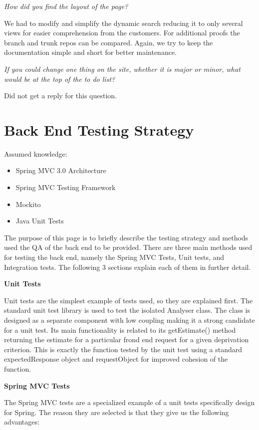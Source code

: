 \documentclass{l3proj}
\begin{document}
\textit{How did you find the layout of the page?}

We had to modify and simplify the dynamic search reducing it to only several views for easier comprehension from the customers. For additional proofs the branch and trunk repos can be compared. Again, we try to keep the documentation simple and short for better maintenance.

\textit{If you could change one thing on the site, whether it is major or minor, what would be at the top of the to do list?}

Did not get a reply for this question.

\section{Back End Testing Strategy}
\label{backEndTesting}


Assumed knowledge:
\begin{itemize}
\item Spring MVC 3.0 Architecture 
\item Spring MVC Testing Framework
\item  Mockito
\item  Java Unit Tests
\end{itemize}

The purpose of this page is to briefly describe the testing strategy and methods used the QA of the back end to be provided. There are three main methods used for testing the back end, namely the Spring MVC Tests, Unit tests, and Integration tests. The following 3 sections explain each of them in further detail.

\textbf{Unit Tests}

Unit tests are the simplest example of tests used, so they are explained first. The standard unit test library is used to test the isolated Analyser class. The class is designed as a separate component with low coupling making it a strong candidate for a unit test. Its main functionality is related to its getEstimate() method returning the estimate for a particular frond end request for a given deprivation criterion. This is exactly the function tested by the unit test using a standard expectedResponse object and requestObject for improved cohesion of the function.

\textbf{Spring MVC Tests}

The Spring MVC tests are a specialized example of a unit tests specifically design for Spring. The reason they are selected is that they give us the following advantages:
\end{document}
